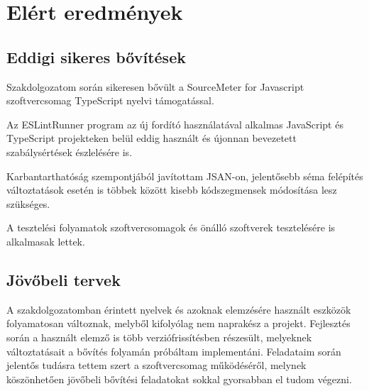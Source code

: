 \chapter{Elért eredmények}
\label{chap:fejezet6}

\section{Eddigi sikeres bővítések}

Szakdolgozatom során sikeresen bővült a SourceMeter for Javascript szoftvercsomag TypeScript nyelvi támogatással. 

Az ESLintRunner program az új fordító használatával alkalmas JavaScript és TypeScript projekteken belül eddig használt és újonnan bevezetett szabálysértések 
észlelésére is.

Karbantarthatóság szempontjából javítottam JSAN-on, jelentősebb séma felépítés változtatások esetén is többek között kisebb kódszegmensek módosítása lesz szükséges.

A tesztelési folyamatok szoftvercsomagok és önálló szoftverek tesztelésére is alkalmasak lettek.

\section{Jövőbeli tervek}

A szakdolgozatomban érintett nyelvek és azoknak elemzésére használt eszközök folyamatosan változnak, melyből kifolyólag nem naprakész a projekt. Fejlesztés során a használt elemző \cite{typescript-eslint} is több verziófrissítésben részesült, melyeknek változtatásait a bővítés folyamán próbáltam implementáni.
Feladataim során jelentős tudásra tettem szert a szoftvercsomag működéséről, melynek köszönhetően jövőbeli bővítési feladatokat sokkal gyorsabban el tudom végezni.